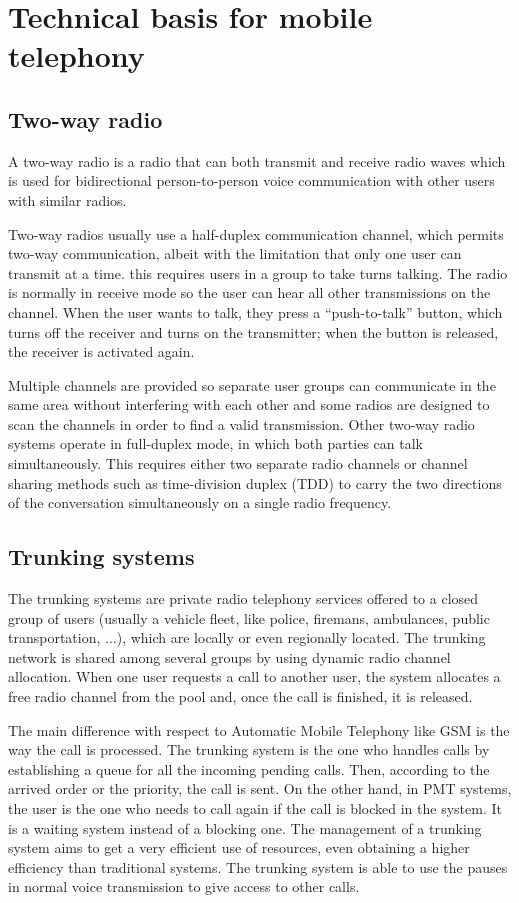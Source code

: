\documentclass[../main.tex]{subfiles}
\begin{document}
\section{Technical basis for mobile telephony}

\subsection{Two-way radio}

A two-way radio is a radio that can both transmit and receive radio waves which is used for bidirectional person-to-person voice communication with other users with similar radios.

Two-way radios usually use a half-duplex communication channel, which permits two-way communication, albeit with the limitation that only one user can transmit at a time. this requires users in a group to take turns talking. The radio is normally in receive mode so the user can hear all other transmissions on the channel. When the user wants to talk, they press a ``push-to-talk'' button, which turns off the receiver and turns on the transmitter; when the button is released, the receiver is activated again.

Multiple channels are provided so separate user groups can communicate in the same area without interfering with each other and some radios are designed to scan the channels in order to find a valid transmission. Other two-way radio systems operate in full-duplex mode, in which both parties can talk simultaneously. This requires either two separate radio channels or channel sharing methods such as time-division duplex (TDD) to carry the two directions of the conversation simultaneously on a single radio frequency.

\subsection{Trunking systems}

The trunking systems are private radio telephony services offered to a closed group of users (usually a vehicle fleet, like police, firemans, ambulances, public transportation, ...), which are locally or even regionally located. The trunking network is shared among several groups by using dynamic radio channel allocation. When one user requests a call to another user, the system allocates a free radio channel from the pool and, once the call is finished, it is released.

The main difference with respect to Automatic Mobile Telephony like GSM is the way the call is processed. The trunking system is the one who handles calls by establishing a queue for all the incoming pending calls. Then, according to the arrived order or the priority, the call is sent. On the other hand, in PMT systems, the user is the one who needs to call again if the call is blocked in the system. It is a waiting system instead of a blocking one. The management of a trunking system aims to get a very efficient use of resources, even obtaining a higher efficiency than traditional systems. The trunking system is able to use the pauses in normal voice transmission to give access to other calls.
\end{document}
